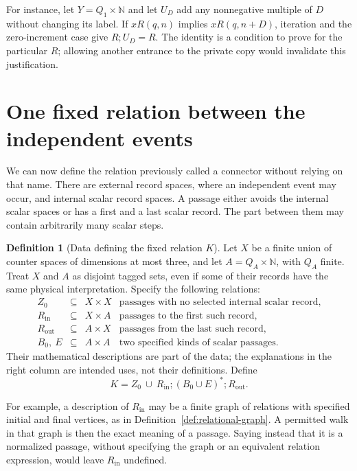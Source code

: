 \documentclass[11pt,a4paper]{article}
\theoremstyle{definition}
\newtheorem{definition}[theorem]{Definition}
\theoremstyle{remark}
\newcommand{\N}{\mathbb N}
\begin{document}
For instance, let \(Y=Q_1\times\N\) and let \(U_D\) add any
nonnegative multiple of \(D\) without changing its label.
If \(xR(q,n)\) implies \(xR(q,n+D)\), iteration and the zero-increment
case give \(R;U_D=R\). The identity is a condition to prove for the
particular \(R\); allowing another entrance to the private copy would
invalidate this justification.



\section{One fixed relation between the independent events}
\label{sec:fixed-K}

We can now define the relation previously called a connector without
relying on that name. There are external record spaces, where an
independent event may occur, and internal scalar record spaces.
A passage either avoids the internal scalar spaces or has a first
and a last scalar record. The part between them may contain
arbitrarily many scalar steps.

\begin{definition}[Data defining the fixed relation \(K\)]
\label{def:K-data}
Let \(X\) be a finite union of counter spaces of dimensions at most
three, and let \(A=Q_A\times\N\), with \(Q_A\) finite.
Treat \(X\) and \(A\) as disjoint tagged sets, even if some of their
records have the same physical interpretation.
Specify the following relations:
\[
\begin{array}{rcll}
 Z_0&\subseteq&X\times X
   &\text{passages with no selected internal scalar record},\\
 R_{\mathrm{in}}&\subseteq&X\times A
   &\text{passages to the first such record},\\
 R_{\mathrm{out}}&\subseteq&A\times X
   &\text{passages from the last such record},\\
 B_0,\ E&\subseteq&A\times A
   &\text{two specified kinds of scalar passages}.
\end{array}
\]
Their mathematical descriptions are part of the data; the explanations
in the right column are intended uses, not their definitions.
Define
\begin{equation}
 K=Z_0\ \cup\
 R_{\mathrm{in}};(B_0\cup E)^*;R_{\mathrm{out}}.
 \label{eq:defined-K}
\end{equation}
\end{definition}

For example, a description of \(R_{\mathrm{in}}\) may be a finite
graph of relations with specified initial and final vertices, as in
Definition~\ref{def:relational-graph}. A permitted walk in that graph
is then the exact meaning of a passage. Saying instead that it is a
normalized passage, without specifying the graph or an equivalent
relation expression, would leave \(R_{\mathrm{in}}\) undefined.
\end{document}
